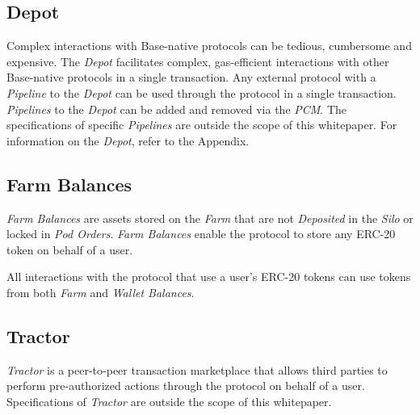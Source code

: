 \documentclass[tikz]{article}
\newcommand{\term}[1]{\textsl{#1}}
\begin{document}

\vspace{0.1cm}
\subsection{Depot}
\vspace{0.1cm}

Complex interactions with Base-native protocols can be tedious, cumbersome and expensive. The \term{Depot} facilitates complex, gas-efficient interactions with other Base-native protocols in a single transaction. Any external protocol with a \term{Pipeline} to the \term{Depot} can be used through the protocol in a single transaction. \term{Pipelines} to the \term{Depot} can be added and removed via the \term{PCM}. The specifications of specific \term{Pipelines} are outside the scope of this whitepaper. For information on the \term{Depot}, refer to the Appendix.


\vspace{0.1cm}
\subsection{Farm Balances}
\vspace{0.1cm}

\term{Farm Balances} are assets stored on the \term{Farm} that are not \term{Deposited} in the \term{Silo} or locked in \term{Pod Orders}. \term{Farm Balances} enable the protocol to store any ERC-20 token on behalf of a user.

All interactions with the protocol that use a user's ERC-20 tokens can use tokens from both \term{Farm} and \term{Wallet Balances}.


\vspace{0.1cm}
\subsection{Tractor}
\vspace{0.1cm}

\term{Tractor} is a peer-to-peer transaction marketplace that allows third parties to perform pre-authorized actions through the protocol on behalf of a user. Specifications of \term{Tractor} are outside the scope of this whitepaper.
\end{document}

